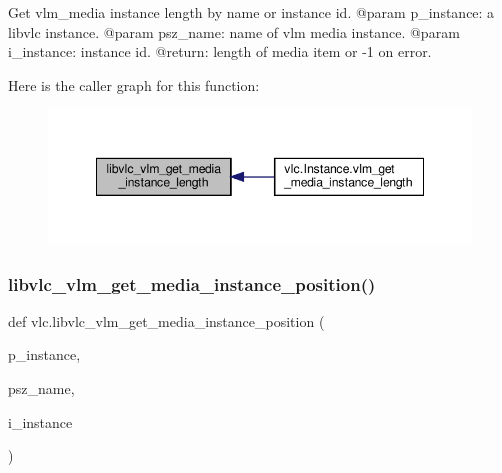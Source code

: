 \begin{DoxyVerb}Get vlm_media instance length by name or instance id.
@param p_instance: a libvlc instance.
@param psz_name: name of vlm media instance.
@param i_instance: instance id.
@return: length of media item or -1 on error.
\end{DoxyVerb}
 Here is the caller graph for this function\+:
\nopagebreak
\begin{figure}[H]
\begin{center}
\leavevmode
\includegraphics[width=348pt]{namespacevlc_ae253451e4dd490269fe9131dbf1abebd_icgraph}
\end{center}
\end{figure}
\mbox{\label{namespacevlc_ad88fbcae963bb382bafa5f582c073ed9}} 
\subsubsection{\texorpdfstring{libvlc\+\_\+vlm\+\_\+get\+\_\+media\+\_\+instance\+\_\+position()}{libvlc\_vlm\_get\_media\_instance\_position()}}
{\footnotesize\ttfamily def vlc.\+libvlc\+\_\+vlm\+\_\+get\+\_\+media\+\_\+instance\+\_\+position (\begin{DoxyParamCaption}\item[{}]{p\+\_\+instance,  }\item[{}]{psz\+\_\+name,  }\item[{}]{i\+\_\+instance }\end{DoxyParamCaption})}


